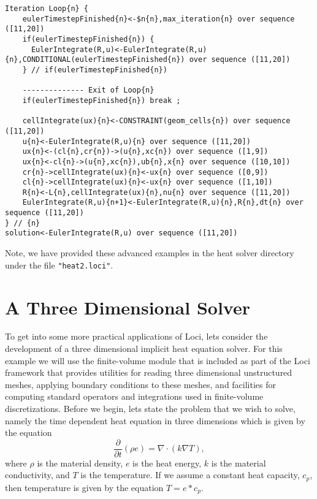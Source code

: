 \documentclass[10pt,epsf]{book}
\begin{document}
\begin{verbatim}
Iteration Loop{n} {
    eulerTimestepFinished{n}<-$n{n},max_iteration{n} over sequence ([11,20])
    if(eulerTimestepFinished{n}) {
      EulerIntegrate(R,u)<-EulerIntegrate(R,u){n},CONDITIONAL(eulerTimestepFinished{n}) over sequence ([11,20])
    } // if(eulerTimestepFinished{n})

    -------------- Exit of Loop{n}
    if(eulerTimestepFinished{n}) break ;

    cellIntegrate(ux){n}<-CONSTRAINT(geom_cells{n}) over sequence ([11,20])
    u{n}<-EulerIntegrate(R,u){n} over sequence ([11,20])
    ux{n}<-(cl{n},cr{n})->(u{n},xc{n}) over sequence ([1,9])
    ux{n}<-cl{n}->(u{n},xc{n}),ub{n},x{n} over sequence ([10,10])
    cr{n}->cellIntegrate(ux){n}<-ux{n} over sequence ([0,9])
    cl{n}->cellIntegrate(ux){n}<-ux{n} over sequence ([1,10])
    R{n}<-L{n},cellIntegrate(ux){n},nu{n} over sequence ([11,20])
    EulerIntegrate(R,u){n+1}<-EulerIntegrate(R,u){n},R{n},dt{n} over sequence ([11,20])
} // {n}
solution<-EulerIntegrate(R,u) over sequence ([11,20])
\end{verbatim}

Note, we have provided these advanced examples in the heat solver
directory under the file {\tt "heat2.loci"}.



\chapter{A Three Dimensional Solver}

To get into some more practical applications of Loci, lets consider
the development of a three dimensional implicit heat equation solver.
For this example we will use the finite-volume module that is included
as part of the Loci framework that provides utilities for reading
three dimensional unstructured meshes, applying boundary conditions to
these meshes, and facilities for computing standard operators and
integrations used in finite-volume discretizations.  Before we begin,
lets state the problem that we wish to solve, namely the time
dependent heat equation in three dimensions which is given by the equation
\begin{equation}
\frac{\partial}{\partial t} (\rho e) = \nabla \cdot (k \nabla T),
\end{equation}
where $\rho$ is the material density, $e$ is the heat energy, $k$ is
the material conductivity, and $T$ is the temperature.  If we assume a
constant heat capacity, $c_p$, then temperature is given by the
equation $T=e*c_p$.
\end{document}
